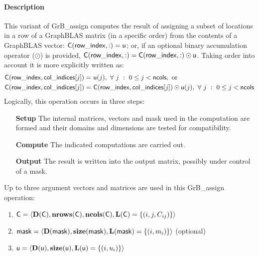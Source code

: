 \paragraph{Description}

This variant of {\sf GrB\_assign} computes the result of assigning a subset of
locations in a row of a GraphBLAS matrix (in a specific order) from the 
contents of a GraphBLAS vector: 
${\sf C}({\sf row\_index},:) = {\sf u}$; or, if an 
optional binary accumulation operator ($\odot$) is provided, 
${\sf C}({\sf row\_index},:) = 
{\sf C}({\sf row\_index},:) \odot {\sf u}$. Taking order into account it is
more explicitly written as:
\[
\begin{aligned}
    {\sf C}({\sf row\_index},{\sf col\_indices}[j]) = &\ {\sf u}(j),
    \ \forall \ j \ : \ 0 \leq j < {\sf ncols}, \mbox{~or~}
    \\
    {\sf C}({\sf row\_index},{\sf col\_indices}[j]) = &\ {\sf C}({\sf row\_index},{\sf col\_indices}[j]) \odot {\sf u}(j), 
    \ \forall \ j \ : \ 0 \leq j < {\sf ncols}
\end{aligned}
\]  
Logically, this operation occurs in three steps:
\begin{enumerate}[leftmargin=0.75in]
\item[\bf Setup] The internal matrices, vectors and mask used in the computation are formed 
and their domains and dimensions are tested for compatibility.
\item[\bf Compute] The indicated computations are carried out.
\item[\bf Output] The result is written into the output matrix, possibly under 
control of a mask.
\end{enumerate}

Up to three argument vectors and matrices are used in this {\sf GrB\_assign} 
operation:
\begin{enumerate}
	\item ${\sf C} = \langle \bold{D}({\sf C}),\bold{nrows}({\sf C}),
    \bold{ncols}({\sf C}),\bold{L}({\sf C}) = \{(i,j,C_{ij}) \} \rangle$
    
	\item ${\sf mask} = \langle \bold{D}({\sf mask}),\bold{size}({\sf mask}),
    \bold{L}({\sf mask}) = \{(i,m_{i}) \} \rangle$ (optional)

	\item ${\sf u} = \langle \bold{D}({\sf u}),\bold{size}({\sf u}),
    \bold{L}({\sf u}) = \{(i,u_i) \} \rangle$
\end{enumerate}

